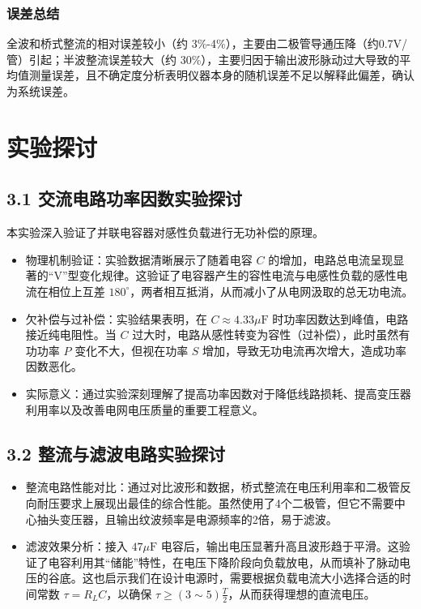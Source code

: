 \documentclass[]{../template/Report}%
\begin{document}
\begin{fullreportonly}
    \subsubsection{误差总结}
    全波和桥式整流的相对误差较小（约 3\%-4\%），主要由二极管导通压降（约0.7V/管）引起；半波整流误差较大（约 30\%），主要归因于输出波形脉动过大导致的平均值测量误差，且不确定度分析表明仪器本身的随机误差不足以解释此偏差，确认为系统误差。


    \section{实验探讨}

    \subsection{3.1 交流电路功率因数实验探讨}
    本实验深入验证了并联电容器对感性负载进行无功补偿的原理。
    \begin{itemize}
        \item 物理机制验证：实验数据清晰展示了随着电容 $C$ 的增加，电路总电流呈现显著的“V”型变化规律。这验证了电容器产生的容性电流与电感性负载的感性电流在相位上互差 $180^\circ$，两者相互抵消，从而减小了从电网汲取的总无功电流。
        \item 欠补偿与过补偿：实验结果表明，在 $C \approx 4.33\mu\text{F}$ 时功率因数达到峰值，电路接近纯电阻性。当 $C$ 过大时，电路从感性转变为容性（过补偿），此时虽然有功功率 $P$ 变化不大，但视在功率 $S$ 增加，导致无功电流再次增大，造成功率因数恶化。
        \item 实际意义：通过实验深刻理解了提高功率因数对于降低线路损耗、提高变压器利用率以及改善电网电压质量的重要工程意义。
    \end{itemize}

    \subsection{3.2 整流与滤波电路实验探讨}
    \begin{itemize}
        \item 整流电路性能对比：通过对比波形和数据，桥式整流在电压利用率和二极管反向耐压要求上展现出最佳的综合性能。虽然使用了4个二极管，但它不需要中心抽头变压器，且输出纹波频率是电源频率的2倍，易于滤波。
        \item 滤波效果分析：接入 $47\mu\text{F}$ 电容后，输出电压显著升高且波形趋于平滑。这验证了电容利用其“储能”特性，在电压下降阶段向负载放电，从而填补了脉动电压的谷底。这也启示我们在设计电源时，需要根据负载电流大小选择合适的时间常数 $\tau = R_L C$，以确保 $\tau \geq (3\sim5) \frac{T}{2}$，从而获得理想的直流电压。
    \end{itemize}


\end{fullreportonly}
\end{document}
